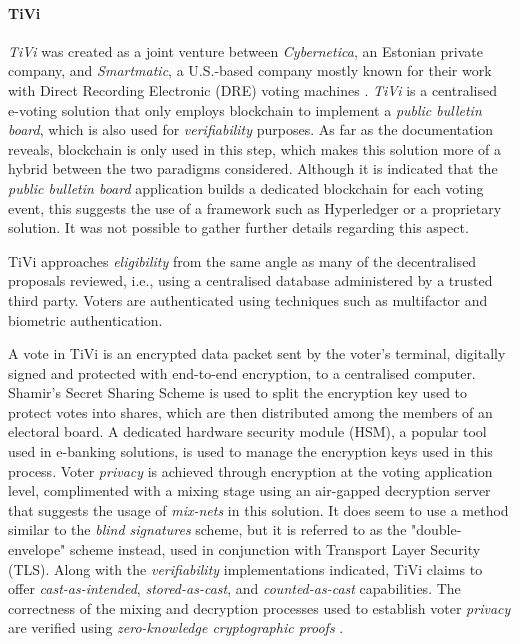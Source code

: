 \documentclass[../access.tex]{subfiles}
\begin{document}
	\paragraph{TiVi \cite{TiVi2021}}
        \textit{TiVi} was created as a joint venture between \textit{Cybernetica}, an Estonian private company, and \textit{Smartmatic}, a U.S.-based company mostly known for their work with Direct Recording Electronic (DRE) voting machines \cite{Tivi2021a}. \textit{TiVi} is a centralised e-voting solution that only employs blockchain to implement a \textit{public bulletin board}, which is also used for \textit{verifiability} purposes. As far as the documentation reveals, blockchain is only used in this step, which makes this solution more of a hybrid between the two paradigms considered. Although it is indicated that the \textit{public bulletin board} application builds a dedicated blockchain for each voting event, this suggests the use of a framework such as Hyperledger or a proprietary solution. It was not possible to gather further details regarding this aspect.
		\par
        TiVi approaches \textit{eligibility} from the same angle as many of the decentralised proposals reviewed, i.e., using a centralised database administered by a trusted third party. Voters are authenticated using techniques such as multifactor and biometric authentication.
		\par
        A vote in TiVi is an encrypted data packet sent by the voter's terminal, digitally signed and protected with end-to-end encryption, to a centralised computer. Shamir's Secret Sharing Scheme \cite{Shamir1979} is used to split the encryption key used to protect votes into shares, which are then distributed among the members of an electoral board. A dedicated hardware security module (HSM), a popular tool used in e-banking solutions, is used to manage the encryption keys used in this process. Voter \textit{privacy} is achieved through encryption at the voting application level, complimented with a mixing stage using an air-gapped decryption server that suggests the usage of \textit{mix-nets} in this solution. It does seem to use a method similar to the \textit{blind signatures} scheme, but it is referred to as the "double-envelope" scheme instead, used in conjunction with Transport Layer Security (TLS). Along with the \textit{verifiability} implementations indicated, TiVi claims to offer \textit{cast-as-intended}, \textit{stored-as-cast}, and \textit{counted-as-cast} capabilities. The correctness of the mixing and decryption processes used to establish voter \textit{privacy} are verified using \textit{zero-knowledge cryptographic proofs} \cite{Tivi2021c}.
\end{document}
